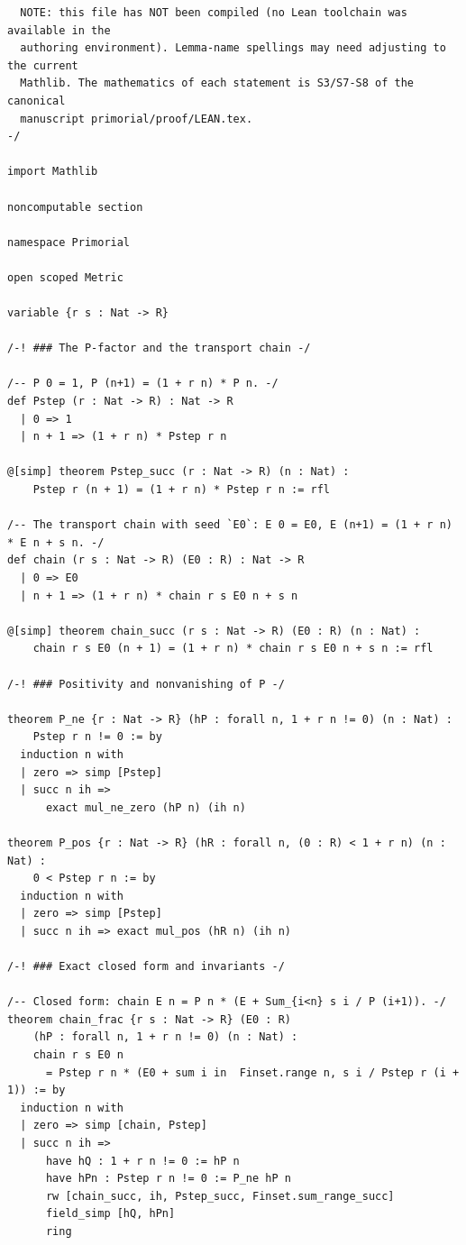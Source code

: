 \documentclass[11pt]{article}
\theoremstyle{remark}
\begin{document}
\begin{verbatim}
  NOTE: this file has NOT been compiled (no Lean toolchain was available in the
  authoring environment). Lemma-name spellings may need adjusting to the current
  Mathlib. The mathematics of each statement is S3/S7-S8 of the canonical
  manuscript primorial/proof/LEAN.tex.
-/

import Mathlib

noncomputable section

namespace Primorial

open scoped Metric

variable {r s : Nat -> R}

/-! ### The P-factor and the transport chain -/

/-- P 0 = 1, P (n+1) = (1 + r n) * P n. -/
def Pstep (r : Nat -> R) : Nat -> R
  | 0 => 1
  | n + 1 => (1 + r n) * Pstep r n

@[simp] theorem Pstep_succ (r : Nat -> R) (n : Nat) :
    Pstep r (n + 1) = (1 + r n) * Pstep r n := rfl

/-- The transport chain with seed `E0`: E 0 = E0, E (n+1) = (1 + r n) * E n + s n. -/
def chain (r s : Nat -> R) (E0 : R) : Nat -> R
  | 0 => E0
  | n + 1 => (1 + r n) * chain r s E0 n + s n

@[simp] theorem chain_succ (r s : Nat -> R) (E0 : R) (n : Nat) :
    chain r s E0 (n + 1) = (1 + r n) * chain r s E0 n + s n := rfl

/-! ### Positivity and nonvanishing of P -/

theorem P_ne {r : Nat -> R} (hP : forall n, 1 + r n != 0) (n : Nat) :
    Pstep r n != 0 := by
  induction n with
  | zero => simp [Pstep]
  | succ n ih =>
      exact mul_ne_zero (hP n) (ih n)

theorem P_pos {r : Nat -> R} (hR : forall n, (0 : R) < 1 + r n) (n : Nat) :
    0 < Pstep r n := by
  induction n with
  | zero => simp [Pstep]
  | succ n ih => exact mul_pos (hR n) (ih n)

/-! ### Exact closed form and invariants -/

/-- Closed form: chain E n = P n * (E + Sum_{i<n} s i / P (i+1)). -/
theorem chain_frac {r s : Nat -> R} (E0 : R)
    (hP : forall n, 1 + r n != 0) (n : Nat) :
    chain r s E0 n
      = Pstep r n * (E0 + sum i in  Finset.range n, s i / Pstep r (i + 1)) := by
  induction n with
  | zero => simp [chain, Pstep]
  | succ n ih =>
      have hQ : 1 + r n != 0 := hP n
      have hPn : Pstep r n != 0 := P_ne hP n
      rw [chain_succ, ih, Pstep_succ, Finset.sum_range_succ]
      field_simp [hQ, hPn]
      ring


\end{verbatim}
\end{document}
